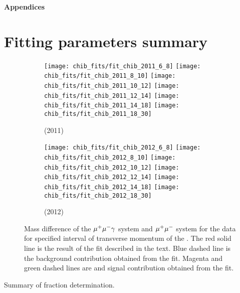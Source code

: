 
\clearpage

{\noindent\bf\Large Appendices}

\appendix

\section{Fitting parameters summary}
\label{sec:FitingParameters}

\begin{figure}[H]
  \centering
    \begin{subfigure}[b]{\textwidth}
      \centering
      \texttt{[image: chib\_fits/fit\_chib\_2011\_6\_8]}
      \texttt{[image: chib\_fits/fit\_chib\_2011\_8\_10]}
      \texttt{[image: chib\_fits/fit\_chib\_2011\_10\_12]}
      \texttt{[image: chib\_fits/fit\_chib\_2011\_12\_14]}
      \texttt{[image: chib\_fits/fit\_chib\_2011\_14\_18]}
      \texttt{[image: chib\_fits/fit\_chib\_2011\_18\_30]}
      \caption{\tev (2011)}
      \label{fig:chib_fits_2011}
    \end{subfigure}
    \begin{subfigure}[b]{\textwidth}
      \centering
      \texttt{[image: chib\_fits/fit\_chib\_2012\_6\_8]}
      \texttt{[image: chib\_fits/fit\_chib\_2012\_8\_10]}
      \texttt{[image: chib\_fits/fit\_chib\_2012\_10\_12]}
      \texttt{[image: chib\_fits/fit\_chib\_2012\_12\_14]}
      \texttt{[image: chib\_fits/fit\_chib\_2012\_14\_18]}
      \texttt{[image: chib\_fits/fit\_chib\_2012\_18\_30]}
      \caption{\tev (2012)}
      \label{fig:chib_fits_2012}
    \end{subfigure}
  \caption{
    \small  Mass difference of the $\mu^+\mu^- \gamma$ system and $\mu^+\mu^-$ system for the 
    data for specified interval of transverse momentum of the \OneS. The red
    solid line is the result of the fit described in the text. Blue dashed line 
    is the background contribution obtained from the fit. Magenta and green 
    dashed lines are \chibone and \chibtwo signal contribution obtained from the fit.
  }
  \label{fig:chib_fits}
\end{figure}


\begin{center}
\begin{table}[t]
\caption{\small Summary of fraction determination.}
\scalebox{0.5}{

}
\label{tab:fit_summary}
\end{table}
\end{center}


